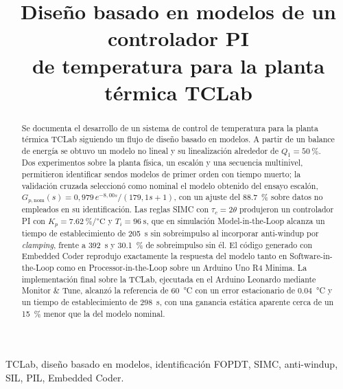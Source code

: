 \documentclass[conference,a4paper,10pt]{IEEEtran}
\newcommand{\Gpnom}{G_{p,\mathrm{nom}}}
\newcommand{\Kp}{K_p}
\newcommand{\Ti}{T_i}
\begin{document}
\title{Diseño basado en modelos de un controlador PI\\
de temperatura para la planta térmica TCLab}

\author{%
}

\maketitle

\begin{abstract}
Se documenta el desarrollo de un sistema de control de temperatura para la planta térmica TCLab
siguiendo un flujo de diseño basado en modelos. A partir de un balance de energía se obtuvo un
modelo no lineal y su linealización alrededor de $Q_1 = \SI{50}{\percent}$. Dos experimentos sobre
la planta física, un escalón y una secuencia multinivel, permitieron identificar sendos modelos de
primer orden con tiempo muerto; la validación cruzada seleccionó como nominal el modelo obtenido
del ensayo escalón, $\Gpnom(s) = 0{,}979\,e^{-8{,}00 s}/(179{,}1 s + 1)$, con un ajuste del
\SI{88.7}{\percent} sobre datos no empleados en su identificación. Las reglas SIMC con
$\tau_c = 2\theta$ produjeron un controlador PI con $\Kp = \SI{7.62}{\percent\per\celsius}$ y
$\Ti = \SI{96}{\second}$, que en simulación Model-in-the-Loop alcanza un tiempo de establecimiento
de \SI{205}{\second} sin sobreimpulso al incorporar anti-windup por \emph{clamping}, frente a
\SI{392}{\second} y \SI{30.1}{\percent} de sobreimpulso sin él. El código generado con Embedded
Coder reprodujo exactamente la respuesta del modelo tanto en Software-in-the-Loop como en
Processor-in-the-Loop sobre un Arduino Uno R4 Minima. La implementación final sobre la TCLab,
ejecutada en el Arduino Leonardo mediante Monitor \& Tune, alcanzó la referencia de
\SI{60}{\celsius} con un error estacionario de \SI{0.04}{\celsius} y un tiempo de establecimiento
de \SI{298}{\second}, con una ganancia estática aparente cerca de un \SI{15}{\percent} menor que la
del modelo nominal.
\end{abstract}

\begin{IEEEkeywords}
TCLab, diseño basado en modelos, identificación FOPDT, SIMC, anti-windup, SIL, PIL, Embedded Coder.
\end{IEEEkeywords}
\end{document}
